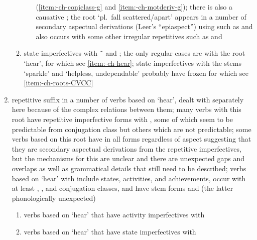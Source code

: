 \begin{morphdesc}[resume*=alphalist]
\begin{enumerate}
\begin{enumerate}
\begin{itemize}
				(\ref{item:-ch-conjclass-g̱} and \ref{item:-ch-motderiv-g̱});
				there is also a causative 
				\parencite[823]{leer:1976};
				the root  ‘pl.\ fall scattered/apart’
				appears in a number of secondary aspectual derivations 
				(Leer’s “epiaspect”) using  such as
				and also occurs with some other irregular repetitives such as
				and 
				\parencite[all][823]{leer:1976}
			\end{itemize}
		\item	\label{item:-ch-oddrep-state}
			state imperfectives with  \~\  and ;
			the only regular cases are with the root  ‘hear’,
				for which see \ref{item:-ch-hear};
			state imperfectives with the stems  ‘sparkle’
				and  ‘helpless, undependable’
				probably have frozen 
				for which see \ref{item:-ch-roots-CVCC}
		\end{enumerate}
	\item	\label{item:-ch-hear}
		repetitive suffix in a number of verbs based on  ‘hear’,
			dealt with separately here because of the complex relations between them;
		many verbs with this root have repetitive imperfective forms with ,
			some of which seem to be predictable from conjugation class
			but others which are not predictable;
		some verbs based on this root have  in all forms regardless of aspect
			suggesting that they are secondary aspectual derivations from the
			repetitive imperfectives, but the mechanisms for this are unclear
			and there are unexpected gaps and overlaps
			as well as grammatical details that still need to be described;
		verbs based on  ‘hear’ with  include states,
			activities, and achievements,
			occur with at least , , and  conjugation classes,
			and have stem forms  and 
			(the latter phonologically unexpected)
		\begin{enumerate}
		\item	verbs based on  ‘hear’
			that have activity imperfectives with 
		\item	verbs based on  ‘hear’
			that have state imperfectives with 
			\begin{itemize}

\end{itemize}
\end{enumerate}
\end{enumerate}
\end{morphdesc}
